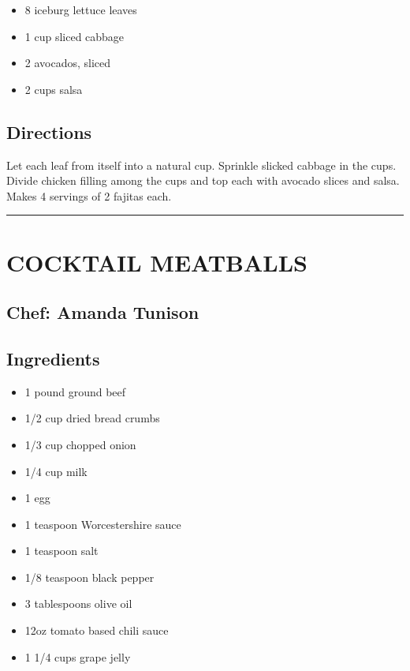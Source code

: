 \documentclass[
]{book}
\providecommand{\tightlist}{%
  \setlength{\itemsep}{0pt}\setlength{\parskip}{0pt}}
\begin{document}
\begin{itemize}
\tightlist
\item
  8 iceburg lettuce leaves
\item
  1 cup sliced cabbage
\item
  2 avocados, sliced
\item
  2 cups salsa
\end{itemize}

\hypertarget{directions-49}{%
\subsection*{Directions}\label{directions-49}}


Let each leaf from itself into a natural cup. Sprinkle slicked cabbage in the cups.
Divide chicken filling among the cups and top each with avocado slices and salsa.
Makes 4 servings of 2 fajitas each.

\begin{center}\rule{0.5\linewidth}{0.5pt}\end{center}

\hypertarget{cocktail-meatballs}{%
\section*{COCKTAIL MEATBALLS}\label{cocktail-meatballs}}


\hypertarget{chef-amanda-tunison}{%
\subsection*{Chef: Amanda Tunison}\label{chef-amanda-tunison}}


\hypertarget{ingredients-50}{%
\subsection*{Ingredients}\label{ingredients-50}}


\begin{itemize}
\tightlist
\item
  1 pound ground beef
\item
  1/2 cup dried bread crumbs
\item
  1/3 cup chopped onion
\item
  1/4 cup milk
\item
  1 egg
\item
  1 teaspoon Worcestershire sauce
\item
  1 teaspoon salt
\item
  1/8 teaspoon black pepper
\item
  3 tablespoons olive oil
\item
  12oz tomato based chili sauce
\item
  1 1/4 cups grape jelly
\end{itemize}
\end{document}
